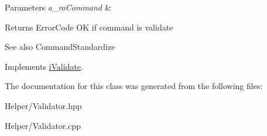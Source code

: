 \begin{DoxyParams}{Parameters}
{\em a\+\_\+ro\+Command} & \\
\hline
\end{DoxyParams}
\begin{DoxyReturn}{Returns}
Error\+Code OK if command is validate 
\end{DoxyReturn}
\begin{DoxySeeAlso}{See also}
Command\+Standardize 
\end{DoxySeeAlso}


Implements \mbox{\hyperlink{classi_validate}{i\+Validate}}.



The documentation for this class was generated from the following files\+:\begin{DoxyCompactItemize}
\item 
Helper/Validator.\+hpp\item 
Helper/Validator.\+cpp\end{DoxyCompactItemize}

